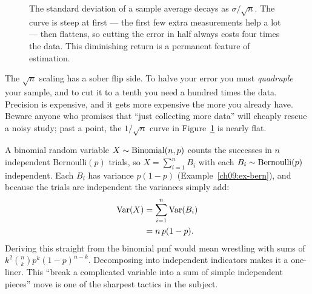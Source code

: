 \begin{figure}[H]
\centering
{}
\caption{The standard deviation of a sample average decays as $\sigma/\sqrt
n$. The curve is steep at first --- the first few extra measurements help a
lot --- then flattens, so cutting the error in half always costs four times
the data. This diminishing return is a permanent feature of estimation.}
\label{ch09:fig-sqrtn}
\end{figure}

\begin{trapbox}
The $\sqrt{n}$ scaling has a sober flip side. To halve your error you must
\emph{quadruple} your sample, and to cut it to a tenth you need a hundred times
the data. Precision is expensive, and it gets more expensive the more you
already have. Beware anyone who promises that ``just collecting more data''
will cheaply rescue a noisy study; past a point, the $1/\sqrt n$ curve in
Figure~\ref{ch09:fig-sqrtn} is nearly flat.
\end{trapbox}

\begin{example}
\label{ch09:ex-binom}
A binomial random variable $X \sim \operatorname{Binomial}(n,p)$ counts the successes in $n$
independent Bernoulli$(p)$ trials, so $X = \sum_{i=1}^n B_i$ with each
$B_i \sim \operatorname{Bernoulli}(p)$ independent. Each $B_i$ has variance $p(1-p)$
(Example~\ref{ch09:ex-bern}), and because the trials are independent the
variances simply add:
\begin{align*}
  \operatorname{Var}(X) &= \sum_{i=1}^n \operatorname{Var}(B_i) \\
  &= n\,p(1-p).
\end{align*}
Deriving this straight from the binomial pmf would mean wrestling with sums of
$k^2\binom{n}{k}p^k(1-p)^{n-k}$. Decomposing into independent indicators makes
it a one-liner. This ``break a complicated variable into a sum of simple
independent pieces'' move is one of the sharpest tactics in the subject.
\end{example}


